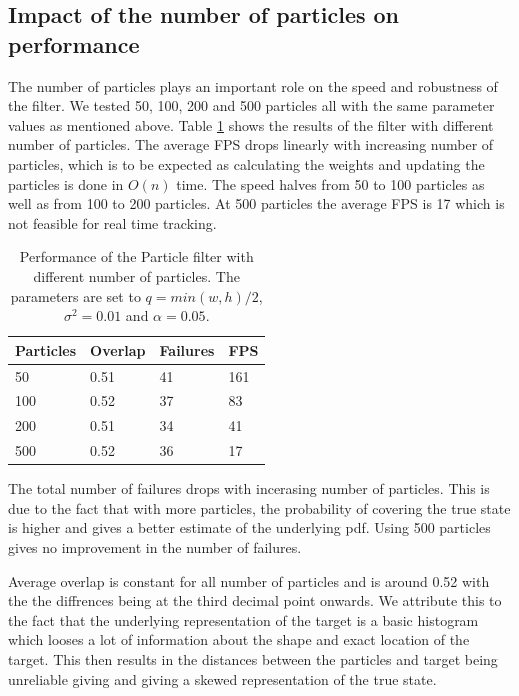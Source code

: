 \documentclass[9pt]{IEEEtran}
\begin{document}
\subsection*{Impact of the number of particles on performance}
The number of particles plays an important role on the speed and robustness of the filter.
We tested 50, 100, 200 and 500 particles all with the same parameter values as mentioned above.
Table \ref{tab:particles} shows the results of the filter with different number of particles.
The average FPS drops linearly with increasing number of particles, which is to be expected as calculating the weights and updating the particles is done in $O(n)$ time.
The speed halves from 50 to 100 particles as well as from 100 to 200 particles.
At 500 particles the average FPS is 17 which is not feasible for real time tracking.

\begin{table}[!ht]
    \centering
    \begin{tabular}{llll}
        \textbf{Particles} & \textbf{Overlap} & \textbf{Failures} & \textbf{FPS} \\ \hline
        50 & 0.51 & 41 & 161 \\ 
        100 & 0.52 & 37 & 83 \\ 
        200 & 0.51 & 34 & 41 \\ 
        500 & 0.52 & 36 & 17 \\ 
    \end{tabular}
    \caption{Performance of the Particle filter with different number of particles. The parameters are set to $q=min(w, h)/2$, $\sigma^2=0.01$ and $\alpha=0.05$.}
    \label{tab:particles}
\end{table}

The total number of failures drops with incerasing number of particles.
This is due to the fact that with more particles, the probability of covering the true state is higher and gives a better estimate of the underlying pdf.
Using 500 particles gives no improvement in the number of failures.

Average overlap is constant for all number of particles and is around 0.52 with the the diffrences being at the third decimal point onwards.
We attribute this to the fact that the underlying representation of the target is a basic histogram which looses a lot of information about the shape and exact location of the target.
This then results in the distances between the particles and target being unreliable giving and giving a skewed representation of the true state.
\end{document}
